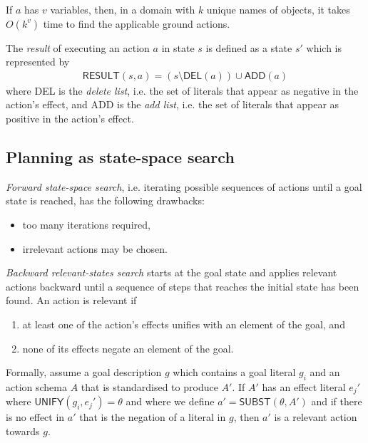 \documentclass{article}
\begin{document}
\begin{lemma}
	If $a$ has $v$ variables, then, in a domain with $k$ unique names of objects,
	it takes $O(k^v)$ time to find the applicable ground actions.
\end{lemma}

\begin{definition}
	The \emph{result} of executing an action $a$ in state $s$ is defined
	as a state $s'$ which is represented by
	\begin{align*}
		\textsf{RESULT}(s,a)=(s\setminus\textsf{DEL}(a))\cup\textsf{ADD}(a)
	\end{align*}
	where DEL is the \emph{delete list}, i.e. the set of literals that appear
	as negative in the action's effect, and ADD is the \emph{add list}, i.e.
	the set of literals that appear as positive in the action's effect.
\end{definition}

\subsection{Planning as state-space search}

\begin{theorem}[R\&N, p. 373]
	\emph{Forward state-space search}, i.e. iterating possible sequences of
	actions until a goal state is reached, has the following drawbacks:
	\begin{itemize}
		\item too many iterations required,
		\item irrelevant actions may be chosen.
	\end{itemize}
\end{theorem}

\begin{definition}
	\emph{Backward relevant-states search} starts at the goal state and applies
	relevant actions backward until a sequence of steps that reaches the initial
	state has been found. An action is relevant if
	\begin{enumerate}
		\item at least one of the action's effects unifies with an element of the goal, and
		\item none of its effects negate an element of the goal.
	\end{enumerate}
	Formally, assume a goal description $g$
	which contains a goal literal $g_i$ and an action schema $A$ that is standardised
	to produce $A'$. If $A'$ has an effect literal $e_j'$ where $\textsf{UNIFY}(g_i,e_j')=\theta$
	and where we define $a'=\textsf{SUBST}(\theta, A')$ and if there is no effect in
	$a'$ that is the negation of a literal in $g$, then $a'$ is a relevant action towards
	$g$.
\end{definition}
\end{document}
